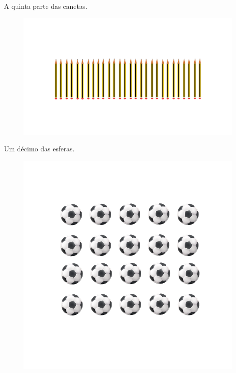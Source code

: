\begin{escolha}
\item
  A quinta parte das canetas.

\begin{figure}[htpb!]
\includegraphics[width=\textwidth]{../ilustracoes/MAT5/SAEB_5ANO_MAT_figura72.png}
\end{figure}

\item
  Um décimo das esferas.

\begin{figure}[htpb!]
\includegraphics[width=\textwidth]{../ilustracoes/MAT5/SAEB_5ANO_MAT_figura73.png}
\end{figure}
\end{escolha}

